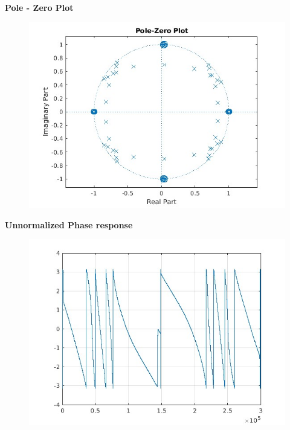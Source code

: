 \documentclass{article}
\begin{document}
    \textbf{Pole - Zero Plot}
    \begin{figure}[H]
    \hspace*{-2.5cm}
        \centering
        \includegraphics[scale = 0.5]{polezero_final_cheby.jpg}
        \caption{}\label{fig:my_label2} %
    \end{figure}

    \textbf{Unnormalized Phase response}
\begin{figure}[H]
\hspace*{-2.5cm}
    \centering
    \includegraphics[scale = 0.5]{multiband_cheby_phase.jpg}
    \label{fig:my_label}
\end{figure}
    
\end{document}
